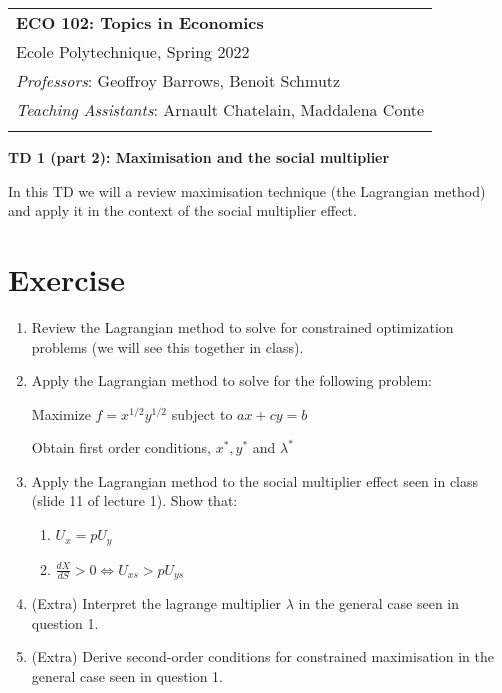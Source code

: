 \documentclass[11pt, a4paper]{article} %
\begin{document}
\begin{tabular}{p{14.5cm}}
	{\large \textbf{ECO 102: Topics in Economics}} \\
	Ecole Polytechnique, Spring 2022  \\
	\textit{Professors}: Geoffroy Barrows, Benoit Schmutz \\
	\textit{Teaching Assistants}: Arnault Chatelain, Maddalena Conte \\
	\hline
	\\
\end{tabular}

\vspace*{0.3cm}	%

\begin{center}
	{\Large \textbf{TD 1 (part 2): Maximisation and the social multiplier}}
	
\end{center} 

\vspace{0.4cm}

In this TD we will a review maximisation technique (the Lagrangian method) and apply it in the context of the social multiplier effect.

\section*{Exercise}

\begin{enumerate}
    \item Review the Lagrangian method to solve for constrained optimization problems (we will see this together in class).
    \item Apply the Lagrangian method to solve for the following problem:
    
    Maximize \(f = x^{1/2} y^{1/2}\) subject to \(ax + cy = b \)
    
    Obtain first order conditions, \(x^{*}, y^{*}\) and \(\lambda^{*}\)
    
    \item Apply the Lagrangian method to the social multiplier effect seen in class (slide 11 of lecture 1). Show that:
    \begin{enumerate}
        \item \(U_x = p U_y\)
        \item \(\frac{dX}{dS} > 0 \Leftrightarrow U_{xs} > p U_{ys}\)
    \end{enumerate}
    \item (Extra) Interpret the lagrange multiplier \(\lambda\) in the general case seen in question 1.
    \item (Extra) Derive second-order conditions for constrained maximisation in the general case seen in question 1.
\end{enumerate}

	
\end{document}
